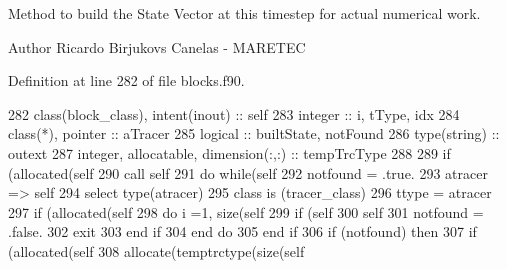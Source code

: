 Method to build the State Vector at this timestep for actual numerical work. 

\begin{DoxyAuthor}{Author}
Ricardo Birjukovs Canelas -\/ M\+A\+R\+E\+T\+EC 
\end{DoxyAuthor}


Definition at line 282 of file blocks.\+f90.


\begin{DoxyCode}
282     \textcolor{keywordtype}{class}(block\_class), \textcolor{keywordtype}{intent(inout)} :: self    
283     \textcolor{keywordtype}{integer} :: i, tType, idx
284     \textcolor{keywordtype}{class}(*), \textcolor{keywordtype}{pointer} :: aTracer
285     \textcolor{keywordtype}{logical} :: builtState, notFound
286     \textcolor{keywordtype}{type}(string) :: outext
287     \textcolor{keywordtype}{integer}, \textcolor{keywordtype}{allocatable}, \textcolor{keywordtype}{dimension(:,:)} :: tempTrcType
288     
289     \textcolor{keywordflow}{if} (\textcolor{keyword}{allocated}(self%
290     \textcolor{keyword}{call }self%
291     \textcolor{keywordflow}{do} \textcolor{keywordflow}{while}(self%
292         notfound = .true.
293         atracer => self%
294         \textcolor{keywordflow}{select type}(atracer)
295 \textcolor{keywordflow}{        class is} (tracer\_class)
296                 ttype = atracer%
297                 \textcolor{keywordflow}{if} (\textcolor{keyword}{allocated}(self%
298                     \textcolor{keywordflow}{do} i =1, \textcolor{keyword}{size}(self%
299                         \textcolor{keywordflow}{if} (self%
300                             self%
301                             notfound = .false.
302                             \textcolor{keywordflow}{exit}
303 \textcolor{keywordflow}{                        end if}
304 \textcolor{keywordflow}{                    end do}
305 \textcolor{keywordflow}{                end if}
306                 \textcolor{keywordflow}{if} (notfound) \textcolor{keywordflow}{then}
307                     \textcolor{keywordflow}{if} (\textcolor{keyword}{allocated}(self%
308                         \textcolor{keyword}{allocate}(temptrctype(\textcolor{keyword}{size}(self%

\end{DoxyCode}
